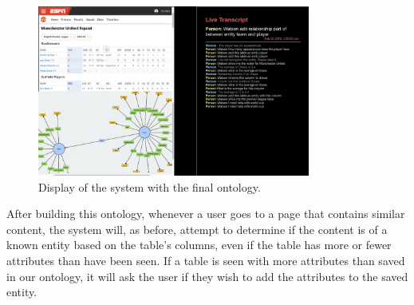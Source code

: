 \begin{figure}[hbtp]
\centering
\includegraphics[width=0.8\textwidth]{chapters/03_reagent/figures/use_case_3.png}
\caption{Display of the system with the final ontology.}
\label{fig:reagent_use_case_3}
\end{figure}

After building this ontology, whenever a user goes to a page that contains
similar content, the system will, as before, attempt to determine if the
content is of a known entity based on the table's columns, even if
the table has more or fewer attributes than have been seen. If a table is seen
with more attributes than saved in our ontology, it will ask the user if they
wish to add the attributes to the saved entity.
